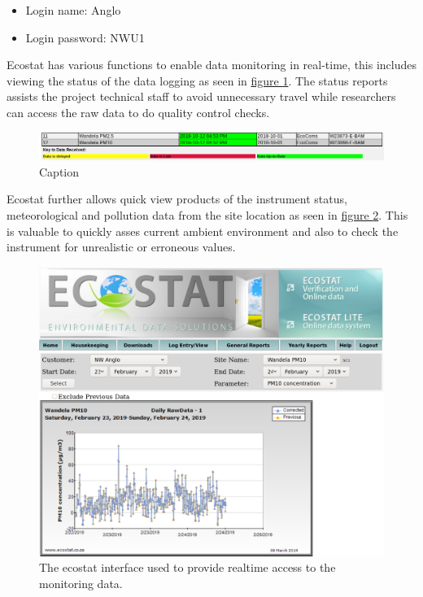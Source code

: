 \documentclass{nwureport}
\begin{document}
  
\begin{itemize}
\item Login name: Anglo
\item Login password: NWU1
\end{itemize}


Ecostat has various functions to enable data monitoring in real-time, this includes
viewing the status of the data logging as seen in \hyperref[fig:ecostat_status]{figure \ref{fig:ecostat_status}}. The status reports assists the project technical staff to avoid
unnecessary travel while researchers can access the raw data to do quality control checks. 

\begin{figure}[!htb]
    \centering
    \includegraphics[width=\textwidth]{images/ecstat_status.png}
    \caption[Ecostat.co.za status report]{Caption}
    \label{fig:ecostat_status}
\end{figure}

Ecostat further allows quick view products of the instrument status,
meteorological and pollution data from the site location as seen
in \hyperref[fig:ecostat_quick]{figure \ref{fig:ecostat_quick}}. This is
valuable to quickly asses current ambient environment and also to check the
instrument for unrealistic or erroneous values.

\begin{figure}[!htb]
    \centering
    \includegraphics[width=\textwidth]{images/ecostat_quick.png}
    \caption[Online interface to the realtime data.]{The ecostat interface used to provide realtime access to the monitoring data.}
    \label{fig:ecostat_quick}
\end{figure}
\end{document}
